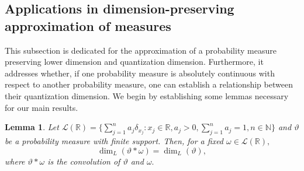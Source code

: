 \documentclass{amsproc}
\newtheorem{lemma}[theorem]{Lemma}
\theoremstyle{definition}
\theoremstyle{remark}
\numberwithin{equation}{section}
\begin{document}
\subsection{Applications in dimension-preserving approximation of measures}
This subsection is dedicated for the approximation of a probability measure preserving lower dimension and quantization dimension. Furthermore, it addresses whether, if one probability measure is absolutely continuous with respect to another probability measure, one can establish a relationship between their quantization dimension. We begin by establishing some lemmas necessary for our main results.

\begin{lemma}\label{convothm}
    Let $\mathcal{L}(\mathbb{R})=\big\{\sum_{j=1}^na_j\delta_{x_j}: x_j\in\mathbb{R},a_j>0,\sum_{j=1}^na_j=1,n\in\mathbb{N}\big\}$ and $\vartheta$ be a probability measure with finite support. Then, for a fixed $\omega\in\mathcal{L}(\mathbb{R}),$  $$\dim_{L}(\vartheta*\omega)=\dim_{L}(\vartheta),$$
    where $\vartheta*\omega$ is the convolution of $\vartheta$ and $\omega.$
\end{lemma}
\end{document}
